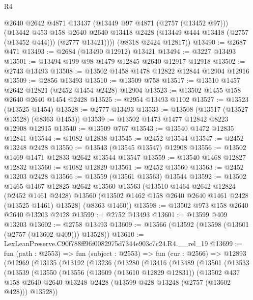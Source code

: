 \begin{lexlean}{R4}
\begin{coremodule}
          @2640
          @2642
          @4871
          @13437
          (@13449 @97 @4871 (@2757 (@13452 @97)))
          (@13442
            @453
            @158
            @2640
            @2640
            @13418
            @2428
            (@13449 @444 @13418 (@2757 (@13452 @444)))
            (@2777 @13421))))
      (@8318 @2424 @12817))
@13490 := @2687 @471
@13493 := @2684 (@13490 @12912) @13421
@13494 := @3227 @13493
@13501 := @13494 @199 @98 @1479 @12845 @2640 @12917 @12918
@13502 := @2743 @13493
@13508 := @13502 @1458 @1478 @12822 @12844 @12904 @12916
@13509 := @2856 @13493
@13510 := @13509 @758
@13517 := @13510 @1457 @2642 @12821 (@2452 @1454 @2428) @12904
@13523 := @13502 @1455 @158 @2640 @2640 @1454 @2428
@13525 := @2954 @13493 @1102
@13527 := @13523 (@13525 @1454)
@13528 := @2777 @13493
@13533 := @13508 (@13517 (@13527 @13528) (@8363 @1453))
@13539 := @13502 @1473 @1477 @12842 @8223 @12908 @12915
@13540 := @13509 @767
@13543 := @13540 @1472 @12835 @12841
@13544 := @1082 @12838
@13545 := @2452 @13544
@13547 := @2452 @13248 @2428
@13550 := @13543 (@13545 @13547) @12908
@13556 := @13502 @1469 @1471 @12833 @2642 @13544 @13547
@13559 := @13540 @1468 @12827 @12832
@13560 := @1082 @12829
@13561 := @2452 @13560
@13563 := @2452 @13203 @2428
@13566 := @13559 (@13561 @13563) @13544
@13592 := @13502
    @1465
    @1467
    @12825
    @2642
    @13560
    @13563
    (@13510
      @1464
      @2642
      @12824
      (@2452 @1461 @2428)
      @13560
      (@13502 @1462 @158 @2640 @2640 @1461 @2428 (@13525 @1461) @13528)
      (@8363 @1460))
@13598 := @13502 @973 @158 @2640 @2640 @13203 @2428
@13599 := @2752 @13493
@13601 := @13599 @409 @13203
@13602 := @2758 @13493
@13609 := @13566 (@13592 (@13598 (@13601 (@2757 (@13602 @409))) @13528))
@13610 := LexLeanPreserve.C90f788ff96f0082975d7344e903c7c24.R4.__rel_19
@13699 := fun (path : @2553) =>
  fun (subject : @2553) =>
  fun (cur : @2566) =>
  @12893
    (@12969
      (@13135
        (@13192
          (@13236
            (@13280
              (@13416
                (@13489
                  (@13501
                    (@13533
                      (@13539
                        (@13550
                          (@13556
                            (@13609 (@13610 @12829 @12831))
                            (@13502
                              @437
                              @158
                              @2640
                              @2640
                              @13248
                              @2428
                              (@13599 @428 @13248 (@2757 (@13602 @428)))
                              @13528))

\end{coremodule}
\end{lexlean}
